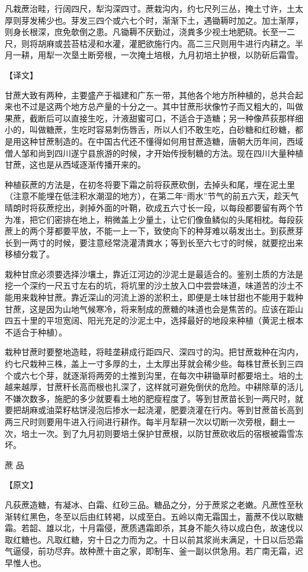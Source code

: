 \documentclass[12pt,UTF8]{ctexbook}
\begin{document}
凡栽蔗治畦，行阔四尺，犁沟深四寸。蔗栽沟内，约七尺列三丛，掩土寸许，土太厚则芽发稀少也。芽发三四个或六七个时，渐渐下土，遇锄耨时加之。加土渐厚，则身长根深，庶免欹倒之患。凡锄耨不厌勤过，浇粪多少视土地肥硗。长至一二尺，则将胡麻或芸苔枯浸和水灌，灌肥欲施行内。高二三尺则用牛进行内耕之。半月一耕，用犁一次垦土断旁根，一次掩土培根，九月初培土护根，以防斫后霜雪。

【译文】

甘蔗大致有两种，主要盛产于福建和广东一带，其他各个地方所种植的，总共合起来也不过是这两个地方总产量的十分之一。其中甘蔗形状像竹子而又粗大的，叫做果蔗，截断后可以直接生吃，汁液甜蜜可口，不适合于造糖；另一种像芦荻那样细小的，叫做糖蔗，生吃时容易刺伤唇舌，所以人们不敢生吃，白砂糖和红砂糖，都是用这种甘蔗制造的。在中国古代还不懂得如何用甘蔗造糖，唐朝大历年间，西域僧人邹和尚到四川遂宁县旅游的时候，才开始传授制糖的方法。现在四川大量种植甘蔗，这也是从西域逐渐传播开来的。

种植荻蔗的方法是，在初冬将要下霜之前将荻蔗砍倒，去掉头和尾，埋在泥土里（注意不能埋在低洼积水潮湿的地方），在第二年“雨水”节气的前五六天，趁天气晴朗时将荻蔗挖出，剥掉外面的叶鞘，砍成五六寸长一段，以每段都要留有两个节为准，把它们密排在地上，稍微盖上少量土，让它们像鱼鳞似的头尾相枕。每段荻蔗上的两个芽都要平放，不能一上一下，致使向下的种芽难以萌发出土。到荻蔗芽长到一两寸的时候，要注意经常浇灌清粪水；等到长至六七寸的时候，就要挖出来移植分栽了。

栽种甘庶必须要选择沙壤土，靠近江河边的沙泥土是最适合的。鉴别土质的方法是挖一个深约一尺五寸左右的坑，将坑里的沙土放入口中尝尝味道，味道苦的沙土不能用来栽种甘蔗。靠近深山的河流上游的淤积土，即便是土味甘甜也不能用于栽种甘蔗，这是因为山地气候寒冷，将来制成的蔗糖的味道也会是焦苦的。应该在距山四五十里的平坦宽阔、阳光充足的沙泥土中，选择最好的地段来种植（黄泥土根本不适合于种植）。

栽种甘蔗时要整地造畦，将畦垄耕成行距四尺、深四寸的沟。把甘蔗栽种在沟内，约七尺栽种三株，盖上一寸多厚的土，土太厚出芽就会稀少些。每株甘蔗长到三四个或六七个芽，就逐渐将两旁的土推到沟里，在每次中耕锄草时都要培土。培的土越来越厚，甘蔗秆长高而根也扎深了，这样就可避免倒伏的危险。中耕除草的活儿不嫌次数多，施肥的多少就要看土地的肥瘦程度了。等到甘蔗苗长到一两尺时，就要把胡麻或油菜籽枯饼浸泡后掺水一起浇灌，肥要浇灌在行内。等到甘蔗苗长高到两三尺时则要用牛进入行间进行耕作。每半月犁耕一次以切断一次旁根，翻土一次，培土一次。到了九月初则要培土保护甘蔗根，以防甘蔗砍收后的宿根被霜雪冻坏。

蔗 品

【原文】

凡荻蔗造糖，有凝冰、白霜、红砂三品。糖品之分，分于蔗浆之老嫩。凡蔗性至秋渐转红黑色，冬至以后由红转褐，以成至白。五岭以南无霜国土，蓄蔗不伐以取糖霜。若韶、雄以北，十月霜侵，蔗质遇霜即杀，其身不能久待以成白色，故速伐以取红糖也。凡取红糖，穷十日之力而为之。十日以前其浆尚未满足，十日以后恐霜气逼侵，前功尽弃。故种蔗十亩之家，即制车、釜一副以供急用。若广南无霜，迟早惟人也。
\end{document}
